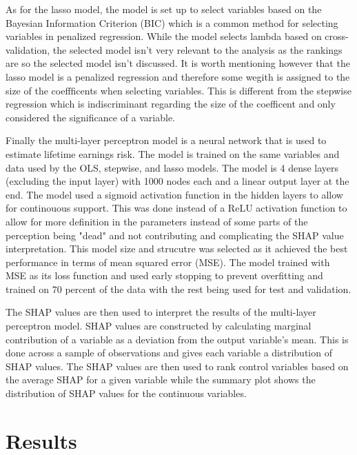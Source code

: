\documentclass[12pt]{article}
\begin{document}
\begin{onehalfspace}
As for the lasso model, the model is set up to select variables based on the Bayesian Information Criterion (BIC) which is a common method for selecting variables in penalized regression. While the model selects lambda based on cross-validation, the selected model isn't very relevant to the analysis as the rankings are so the selected model isn't discussed. It is worth mentioning however that the lasso model is a penalized regression and therefore some wegith is assigned to the size of the coeffficents when selecting variables. This is different from the stepwise regression which is indiscriminant regarding the size of the coefficent and only considered the significance of a variable.

Finally the multi-layer perceptron model is a neural network that is used to estimate lifetime earnings risk. The model is trained on the same variables and data used by the OLS, stepwise, and lasso models. The model is 4 dense layers (excluding the input layer) with 1000 nodes each and a linear output layer at the end. The model used a sigmoid activation function in the hidden layers to allow for continouous support. This was done instead of a ReLU activation function to allow for more definition in the parameters instead of some parts of the perception being "dead" and not contributing and complicating the SHAP value interpretation. This model size and strucutre was selected as it achieved the best performance in terms of mean squared error (MSE). The model trained with MSE as its loss function and used early stopping to prevent overfitting and trained on 70 percent of the data with the rest being used for test and validation.

The SHAP values are then used to interpret the results of the multi-layer perceptron model. SHAP values are constructed by calculating marginal contribution of a variable as a deviation from the output variable's mean. This is done across a sample of observations and gives each variable a distribution of SHAP values. The SHAP values are then used to rank control variables based on the average SHAP for a given variable while the summary plot shows the distribution of SHAP values for the continuous variables. 



\section{Results}





\end{onehalfspace}
\end{document}
